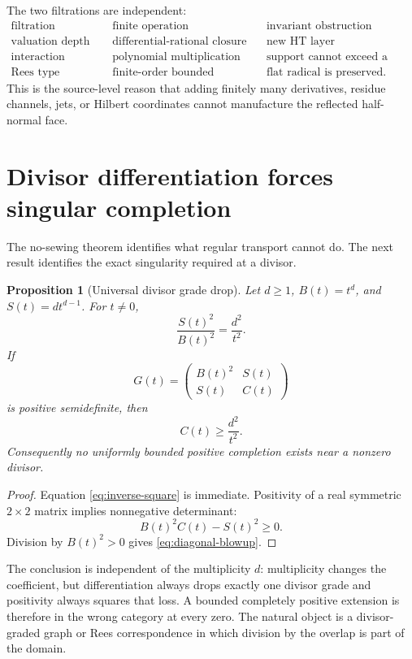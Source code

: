 \documentclass[11pt]{article}
\newtheorem{proposition}[theorem]{Proposition}
\theoremstyle{definition}
\theoremstyle{remark}
\begin{document}
The two filtrations are independent:
\[
 \begin{array}{c|c|c}
 \text{filtration}&\text{finite operation}&\text{invariant obstruction}\\ \hline
 \text{valuation depth}&\text{differential-rational closure}&
   \text{new HT layer}\\
 \text{interaction support}&\text{polynomial multiplication}&
   \text{support cannot exceed a union}\\
 \text{Rees type}&\text{finite-order bounded transport}&
   \text{flat radical is preserved}.
 \end{array}
\tag{7.5}\label{eq:three-filtrations}
\]
This is the source-level reason that adding finitely many derivatives, residue channels, jets,
or Hilbert coordinates cannot manufacture the reflected half-normal face.

\section{Divisor differentiation forces singular completion}\label{sec:divisor}

The no-sewing theorem identifies what regular transport cannot do.  The next result identifies
the exact singularity required at a divisor.

\begin{proposition}[Universal divisor grade drop]\label{prop:divisor-drop}
Let \(d\geq1\), \(B(t)=t^d\), and \(S(t)=dt^{d-1}\).  For \(t\neq0\),
\[
 \frac{S(t)^2}{B(t)^2}=\frac{d^2}{t^2}.
\tag{8.1}\label{eq:inverse-square}
\]
If
\[
 G(t)=
 \begin{pmatrix}
 B(t)^2&S(t)\\
 S(t)&C(t)
 \end{pmatrix}
\tag{8.2}\label{eq:divisor-gram}
\]
is positive semidefinite, then
\[
 C(t)\geq\frac{d^2}{t^2}.
\tag{8.3}\label{eq:diagonal-blowup}
\]
Consequently no uniformly bounded positive completion exists near a nonzero divisor.
\end{proposition}

\begin{proof}
Equation \eqref{eq:inverse-square} is immediate.  Positivity of a real symmetric
\(2\times2\) matrix implies nonnegative determinant:
\[
 B(t)^2C(t)-S(t)^2\geq0.
\]
Division by \(B(t)^2>0\) gives \eqref{eq:diagonal-blowup}.
\end{proof}

The conclusion is independent of the multiplicity \(d\): multiplicity changes the coefficient,
but differentiation always drops exactly one divisor grade and positivity always squares that
loss.  A bounded completely positive extension is therefore in the wrong category at every
zero.  The natural object is a divisor-graded graph or Rees correspondence in which division by
the overlap is part of the domain.
\end{document}
